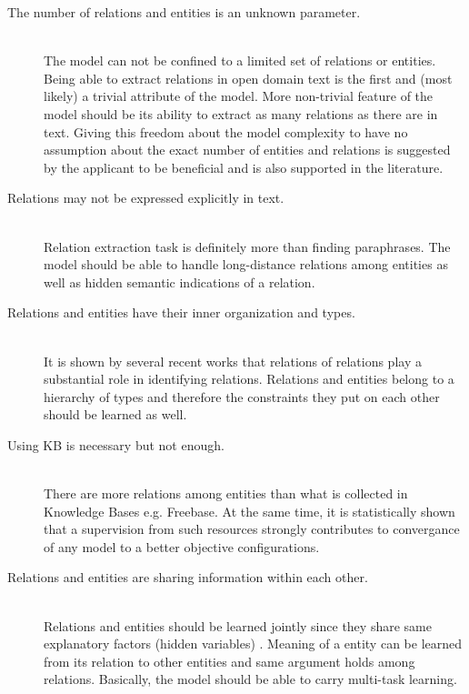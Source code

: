 \documentclass[12pt]{report}
\begin{document}
\begin{description}
  
  \item[The number of relations and entities is an unknown parameter.] \hfill \\
  The model can not be confined to a limited set of relations or entities. Being able to extract relations in
  open domain text is the first and (most likely) a trivial attribute of the model. More non-trivial feature
  of the model should be its ability to extract as many relations as there are in text. 
  Giving this freedom
  about the model complexity to have no assumption about the exact number of entities and relations
  is suggested by the applicant to be beneficial 
   and is also supported in the literature.
   \cite{Mintz2009} \cite{Yates2007}  

  \item[Relations may not be expressed explicitly in text.] \hfill \\
  Relation extraction task is definitely more than finding paraphrases. The model should be able to handle
  long-distance relations among entities as well as hidden semantic indications of a relation. \cite{Poon2009}
  


  \item[Relations and entities have their inner organization and types.] \hfill \\
  It is shown by several recent works that relations of relations play a substantial role in identifying
  relations. Relations and entities belong to a hierarchy of types and therefore the constraints they put on each other
  should be learned as well.\cite{Yao2011} \cite{Alfonseca2012} \cite{Nakashole2012a}

  \item[Using KB is necessary but not enough.] \hfill \\
  There are more relations among entities than what is collected in 
  Knowledge Bases e.g. Freebase. At the same time, it is statistically shown that a supervision
  from such resources strongly contributes to convergance of any model to a better 
  objective configurations.\cite{Yao2011} \cite{Mintz2009}

  \item[Relations and entities are sharing information within each other.] \hfill \\
  Relations and entities should be learned jointly since they share same explanatory factors (hidden variables)
  . Meaning of a entity can be learned from its relation to other entities and same argument holds among relations.
  Basically, the model should be able to carry multi-task learning. \cite{Yao2011} 
    
\end{description}
\end{document}
